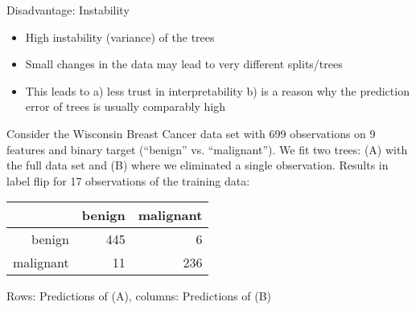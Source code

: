 \documentclass[11pt,compress,t,notes=noshow, xcolor=table]{beamer}
\begin{document}
 \begin{frame2}{Disadvantage: Instability}
 \begin{itemize}
 \item High instability (variance) of the trees
 \item Small changes in the data may lead to very different splits/trees
 \item This leads to a) less trust in interpretability b) is a reason why the prediction error of trees is usually comparably high
 \end{itemize}

Consider the Wisconsin Breast Cancer data set with 699 observations on 9 features and binary target (\enquote{benign} vs. \enquote{malignant}). We fit two trees: (A) with the full data set and (B) where we eliminated a single observation. Results in label flip for 17 observations of the training data:

\begin{table}[ht]
\centering
\begin{tabular}{rrr}
  \hline
 & benign & malignant \\ 
  \hline
benign & 445 &   6 \\ 
  malignant &  11 & 236 \\ 
   \hline
\end{tabular}
\end{table}

Rows: Predictions of (A), columns: Predictions of (B) %



\end{frame2}
\end{document}
